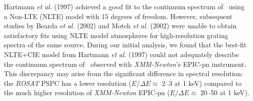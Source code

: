 	Hartmann \textit{et al.} (1997) \cite{hartmann1999constraining} achieved a good fit to the continuum spectrum of \source\ using a Non-LTE (NLTE) model with 15 degrees of freedom. However, subsequent studies by Bearda \textit{et al.} (2002) \cite{beardaChandra2002AA} and Motch \textit{et al.} (2002) \cite{motchXmmNewton2002AA} were unable to obtain satisfactory fits using NLTE model atmospheres for high-resolution grating spectra of the same source. During our initial analysis, we found that the best-fit NLTE+CIE model from Hartmann \textit{et al.} (1997) \cite{hartmann1999constraining} could not adequately describe the continuum spectrum of \source\ observed with \textit{XMM-Newton}'s EPIC-pn instrument. This discrepancy may arise from the significant difference in spectral resolution: the \textit{ROSAT} PSPC has a lower resolution ($E/\Delta E\approx$ 2--3 at 1 keV) compared to the much higher resolution of \textit{XMM-Newton} EPIC-pn ($E/\Delta E\approx$ 20--50 at 1 keV).
	
